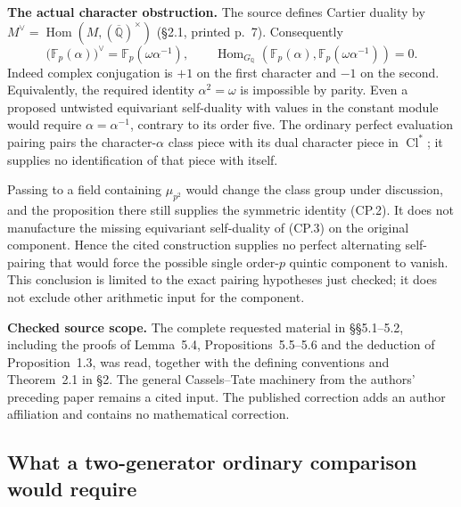 \documentclass[11pt,a4paper]{article}
\theoremstyle{definition}
\renewcommand{\paragraph}[1]{\par\smallskip\noindent\textbf{#1}\quad\ignorespaces}
\begin{document}
\paragraph{The actual character obstruction.}
The source defines Cartier duality by
$M^\vee=\operatorname{Hom}(M,(\overline{\mathbb Q})^\times)$
(\S2.1, printed p.~7).  Consequently
\[
 \bigl(\mathbb F_p(\alpha)\bigr)^\vee
   =\mathbb F_p(\omega\alpha^{-1}),\qquad
 \operatorname{Hom}_{G_{\mathbb Q}}\!
 \left(\mathbb F_p(\alpha),
       \mathbb F_p(\omega\alpha^{-1})\right)=0.
 \tag{CP.3}
\]
Indeed complex conjugation is $+1$ on the first character and $-1$ on
the second.  Equivalently, the required identity $\alpha^2=\omega$
is impossible by parity.  Even a proposed untwisted equivariant
self-duality with values in the constant module would require
$\alpha=\alpha^{-1}$, contrary to its order five.  The ordinary
perfect evaluation pairing pairs the character-$\alpha$ class piece
with its dual character piece in $\operatorname{Cl}^{*}$; it supplies
no identification of that piece with itself.

Passing to a field containing $\mu_{p^2}$ would change the class group
under discussion, and the proposition there still supplies the symmetric
identity (CP.2).  It does not manufacture the missing equivariant
self-duality of (CP.3) on the original component.  Hence the cited
construction supplies no perfect alternating self-pairing that would
force the possible single order-$p$ quintic component to vanish.
This conclusion is limited to the exact pairing hypotheses just checked;
it does not exclude other arithmetic input for the component.

\paragraph{Checked source scope.}
The complete requested material in \S\S5.1--5.2, including the proofs
of Lemma~5.4, Propositions~5.5--5.6 and the deduction of Proposition~1.3,
was read, together with the defining conventions and Theorem~2.1 in
\S2.  The general Cassels--Tate machinery from the authors' preceding
paper remains a cited input.  The published correction
 adds an author affiliation and
contains no mathematical correction.



\subsection{What a two-generator ordinary comparison would require}
\end{document}
